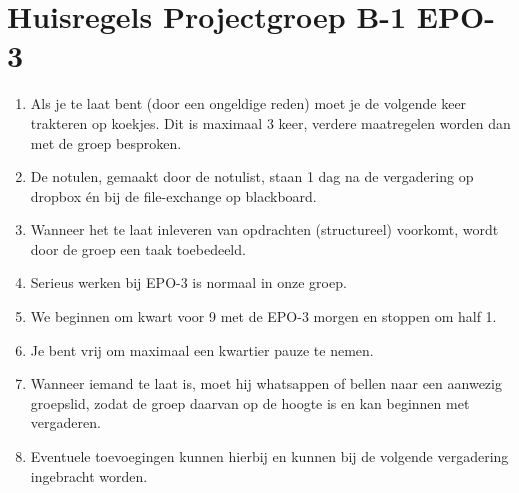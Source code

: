 \documentclass{article}
\begin{document}
\section*{Huisregels Projectgroep B-1 EPO-3}

\begin{enumerate}
\item Als je te laat bent (door een ongeldige reden) moet je de volgende keer trakteren op 
koekjes. Dit is maximaal 3 keer, verdere maatregelen worden dan met de groep 
besproken.

\item De notulen, gemaakt door de notulist, staan 1 dag na de vergadering op dropbox 
én bij de file-exchange op blackboard.

\item Wanneer het te laat inleveren van opdrachten (structureel) voorkomt, wordt door de 
groep een taak toebedeeld.

\item Serieus werken bij EPO-3 is normaal in onze groep. 

\item We beginnen om kwart voor 9 met de EPO-3 morgen en stoppen om half 1.

\item Je bent vrij om maximaal een kwartier pauze te nemen. 

\item Wanneer iemand te laat is, moet hij whatsappen of bellen naar een aanwezig groepslid, 
zodat de groep daarvan op de hoogte is en kan beginnen met vergaderen. 

\item Eventuele toevoegingen kunnen hierbij en kunnen bij de volgende vergadering 
ingebracht worden.

\end{enumerate}
\end{document}
